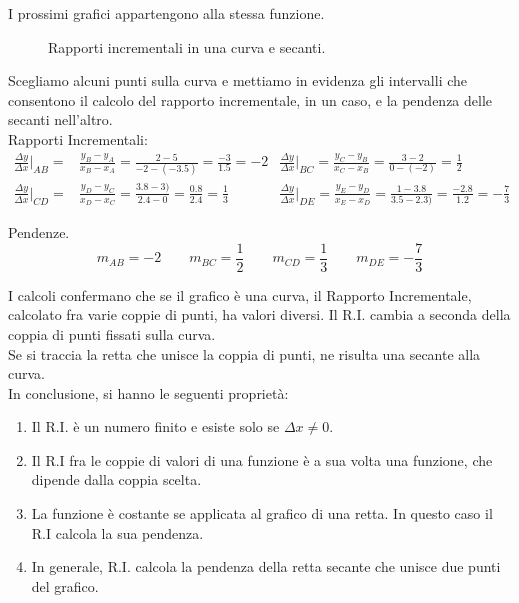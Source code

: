 \begin{esempio}
I prossimi grafici appartengono alla stessa funzione.

\begin{figure}[h]
\begin{inaccessibleblock}
 \begin{minipage}[]{.45\textwidth}
 \curvacubica
 \end{minipage} 
 \hfill
 \begin{minipage}[]{.55\textwidth}
  \secanticubica
 \end{minipage}
\end{inaccessibleblock}
\caption{Rapporti incrementali in una curva e secanti.} 
\label{}
\end{figure}

Scegliamo alcuni punti sulla curva e mettiamo in evidenza gli intervalli che
consentono il calcolo del rapporto incrementale, in un caso, e la pendenza 
delle secanti nell'altro.\\
Rapporti Incrementali:
\begin{align*}
  \frac{\Delta y}{\Delta x}\bigg\lvert_{AB}= &\frac{y_B-y_A}{x_B-x_A}=
    \frac{2-5}{-2-(-3.5)}=\frac{-3}{1.5}=-2 &
  \frac{\Delta y}{\Delta x}\bigg\rvert_{BC}=\frac{y_C-y_B}{x_C-x_B}=
  \frac{3-2}{0-(-2)}=\frac{1}{2}\\
  \frac{\Delta y}{\Delta x}\bigg\lvert_{CD}= &\frac{y_D-y_C}{x_D-x_C}=
  \frac{3.8-3)}{2.4-0}=\frac{0.8}{2.4}=\frac{1}{3} &
  \frac{\Delta y}{\Delta x}\bigg\rvert_{DE}=\frac{y_E-y_D}{x_E-x_D}=
  \frac{1-3.8}{3.5-2.3)}=\frac{-2.8}{1.2}=-\frac{7}{3}
\end{align*}

Pendenze.\\
$$  m_{AB}=-2 \qquad m_{BC}=\frac{1}{2}\qquad m_{CD}=\frac{1}{3}\qquad  
m_{DE}=-\frac{7}{3}$$
\end{esempio}

I calcoli confermano che se il grafico è una curva, il Rapporto Incrementale, 
calcolato fra varie coppie di punti, ha valori diversi. 
Il R.I. cambia a seconda della coppia di punti fissati sulla curva.\\
Se si traccia la retta che unisce la coppia di punti, ne risulta una secante
alla curva.\\
In conclusione, si hanno le seguenti proprietà:

\begin{enumerate}[noitemsep]
\item Il R.I. è un numero finito e esiste solo se $\Delta x\ne 0$.
\item Il R.I fra le coppie di valori di una funzione è 
 a sua volta una funzione, che dipende dalla coppia scelta. 
 \item La funzione è costante se applicata al grafico di una retta. In questo 
 caso il R.I calcola  la sua pendenza.
\item  In generale, R.I. calcola la pendenza della retta secante che unisce 
due punti del grafico.
\end{enumerate}


